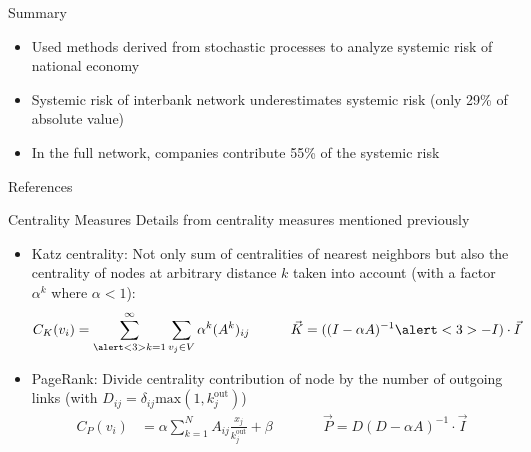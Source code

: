 \documentclass[]{beamer}
\begin{document}
\begin{frame}{Summary}
	\begin{itemize}
		\item Used methods derived from stochastic processes to analyze systemic risk of national economy
		\bigskip
		\item Systemic risk of interbank network underestimates systemic risk (only 29\% of absolute value)
		\item In the full network, companies contribute 55\% of the systemic risk
	\end{itemize}
\end{frame}


\appendix

\begin{frame}[allowframebreaks]{References}
	\nocite{newman_networks:_2010}
	
%	
\end{frame}


\begin{frame}{Centrality Measures}
	Details from centrality measures mentioned previously
	\begin{itemize}
		\item Katz centrality: Not only sum of centralities of nearest neighbors but also the centrality of nodes at arbitrary distance $k$ taken into account (with a factor $\alpha^k$ where $\alpha<1$):
		\begin{align*}
		C_K(v_i) &= \sum_{\alert<3>{k=1}}^\infty\sum_{v_j\in V}\alpha^k (A^k)_{ij} \qquad
		&&
			\vec K = ((I - \alpha A)^{-1} \alert<3>{-I})\cdot\vec I
		\end{align*}
		\item PageRank: Divide centrality contribution of node by the number of outgoing links (with $D_{ij} = \delta_{ij}\mathrm{max}(1,k_j^\text{out})$)
		\begin{align*}
			C_P(v_i) &=  \alpha\sum_{k=1}^N A_{ij}\frac{x_j}{k_j^\text{out}} +  \beta\qquad
			&&
			\vec P = D(D - \alpha A)^{-1}\cdot\vec I
		\end{align*}
	\end{itemize}
\end{frame}	
\end{document}
